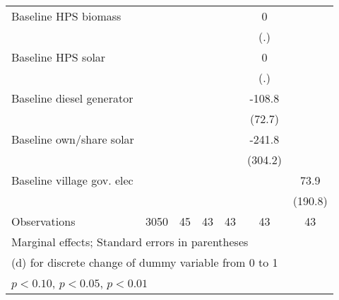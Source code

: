 \begin{table}[htbp]
\begin{tabular*}{1\hsize}{@{\hskip\tabcolsep\extracolsep\fill}l*{6}{c}}
Baseline HPS biomass&                  &                  &                  &                  &        0         &                  \\
                &                  &                  &                  &                  &      (.)         &                  \\
Baseline HPS solar&                  &                  &                  &                  &        0         &                  \\
                &                  &                  &                  &                  &      (.)         &                  \\
Baseline diesel generator&                  &                  &                  &                  &   -108.8         &                  \\
                &                  &                  &                  &                  &   (72.7)         &                  \\
Baseline own/share solar&                  &                  &                  &                  &   -241.8         &                  \\
                &                  &                  &                  &                  &  (304.2)         &                  \\
Baseline village gov. elec&                  &                  &                  &                  &                  &     73.9         \\
                &                  &                  &                  &                  &                  &  (190.8)         \\
\midrule
Observations    &     3050         &       45         &       43         &       43         &       43         &       43         \\
\bottomrule
\multicolumn{7}{l}{\footnotesize Marginal effects; Standard errors in parentheses}\\
\multicolumn{7}{l}{\footnotesize  (d) for discrete change of dummy variable from 0 to 1}\\
\multicolumn{7}{l}{\footnotesize \sym{*} \(p<0.10\), \sym{**} \(p<0.05\), \sym{***} \(p<0.01\)}\\
\end{tabular*}
\end{table}
